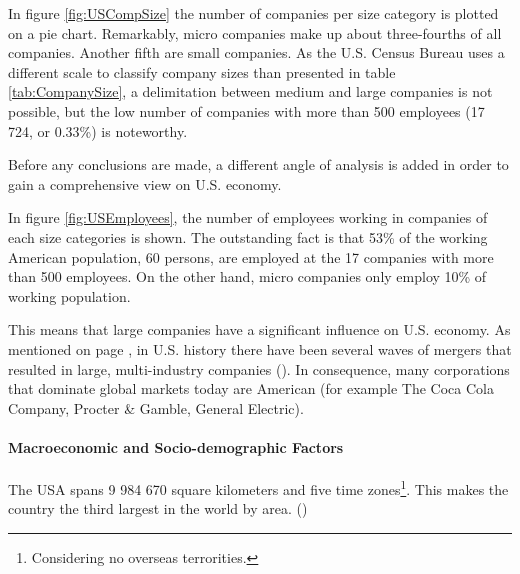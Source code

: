 In figure \ref{fig:USCompSize} the number of companies per size category is plotted on a pie chart. Remarkably, micro companies make up about  three-fourths of all companies. Another fifth are small companies. As the U.S. Census Bureau uses a different scale to classify company sizes than presented in table \ref{tab:CompanySize}, a delimitation between medium and large companies is not possible, but the low number of companies with more than 500 employees (17 724, or 0.33\%) is noteworthy.

Before any conclusions are made, a different angle of analysis is added in order to gain a comprehensive view on U.S. economy.



In figure \ref{fig:USEmployees}, the number of employees working in companies of each size categories is shown. The outstanding fact is that 53\% of the working American population, 60   persons, are employed at the 17  companies with more than 500 employees. On the other hand, micro companies only employ 10\% of working population.

This means that large companies have a significant influence on U.S. economy. As mentioned on page \pageref{par:USHistory}, in U.S. history there have been several waves of mergers that resulted in large, multi-industry companies (\cite{Winkler.1994b}). In consequence, many corporations that dominate global markets today are American (for example The Coca Cola Company, Procter \nolinebreak \& \nolinebreak Gamble, General Electric). 


\paragraph{Macroeconomic and Socio-demographic Factors}
The USA spans 9 984 670 square kilometers and five time zones\footnote{Considering no overseas terrorities.}. This makes the country the third largest in the world by area. (\cite{CentralIntelligenceAgency.2016})


